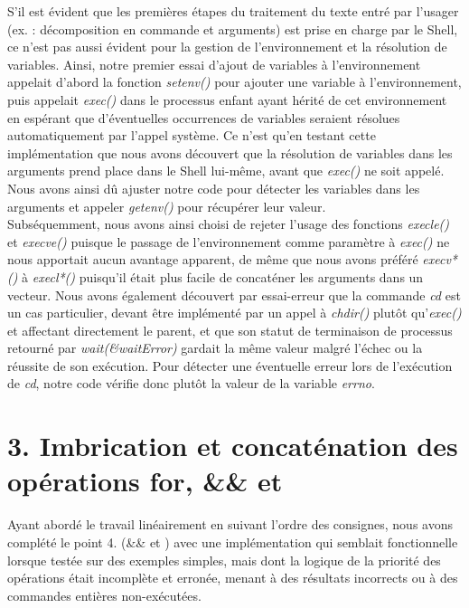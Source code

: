 \documentclass{article}
\begin{document}
\setlength{\parindent}{20pt}
S’il est évident que les premières étapes du traitement du texte entré par l’usager (ex. : décomposition en commande et arguments) est prise en charge par le Shell, ce n’est pas aussi évident pour la gestion de l’environnement et la résolution de variables. Ainsi, notre premier essai d’ajout de variables à l’environnement appelait d’abord la fonction \emph{setenv()} pour ajouter une variable à l’environnement, puis appelait \emph{exec()} dans le processus enfant ayant hérité de cet environnement en espérant que d’éventuelles occurrences de variables seraient résolues automatiquement par l’appel système. Ce n’est qu’en testant cette implémentation que nous avons découvert que la résolution de variables dans les arguments prend place dans le Shell lui-même, avant que \emph{exec()} ne soit appelé. Nous avons ainsi dû ajuster notre code pour détecter les variables dans les arguments et appeler \emph{getenv()} pour récupérer leur valeur. 
\\

\setlength{\parindent}{20pt}
Subséquemment, nous avons ainsi choisi de rejeter l’usage des fonctions \emph{execle()} et \emph{execve()} puisque le passage de l’environnement comme paramètre à \emph{exec()} ne nous apportait aucun avantage apparent, de même que nous avons préféré \emph{execv*()} à \emph{execl*()} puisqu’il était plus facile de concaténer les arguments dans un vecteur.
Nous avons également découvert par essai-erreur que la commande \emph{cd} est un cas particulier, devant être implémenté par un appel à \emph{chdir()} plutôt qu’\emph{exec()} et affectant directement le parent, et que son statut de terminaison de processus retourné par \emph{wait(\&waitError)} gardait la même valeur malgré l'échec ou la réussite de son exécution. Pour détecter une éventuelle erreur lors de l’exécution de \emph{cd}, notre code vérifie donc plutôt la valeur de la variable \emph{errno}.

\section*{ 3. Imbrication et concaténation des opérations for, \&\& et \textbar\textbar }
\setlength{\parindent}{20pt}
Ayant abordé le travail linéairement en suivant l’ordre des consignes, nous avons complété le point 4. (\&\& et \textbar\textbar) avec une implémentation qui semblait fonctionnelle lorsque testée sur des exemples simples, mais dont la logique de la priorité des opérations était incomplète et erronée, menant à des résultats incorrects ou à des commandes entières non-exécutées.
\\
\end{document}

